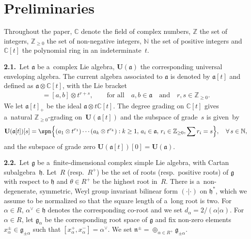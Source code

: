 \section{Preliminaries}\label{section2}

Throughout the paper, $\mathbb{C}$ denote the f\/ield of complex numbers, $\mathbb{Z}$ the set of integers,
$\mathbb{Z}_{\geq 0}$ the set of non-negative integers, $\mathbb{N}$ the set of positive integers and $\mathbb{C}[t]$
the polynomial ring in an indeterminate~$t$.

{\bf 2.1.}~Let $\mathfrak{a}$ be a~complex Lie algebra, $\mathbf{U}(\mathfrak{a})$ the corresponding universal
enveloping algebra.
The current algebra associated to $\mathfrak{a}$ is denoted by $\mathfrak{a}[t]$ and def\/ined as $\mathfrak{a} \otimes
\mathbb{C}[t]$, with the Lie bracket
\begin{gather*}
[a \otimes t^r, b \otimes t^s]=[a, b]\otimes t^{r+s},
\qquad
\text{for all}
\quad
a, b \in \mathfrak{a}
\quad
\text{and}
\quad
r, s \in \mathbb{Z}_{\geq 0}.
\end{gather*}
We let $\mathfrak{a}[t]_{+}$ be the ideal $\mathfrak{a}\otimes t\mathbb{C}[t]$. The degree grading on $\mathbb{C}[t]$
gives a~natural $\mathbb{Z}_{\geq 0}$-grading on~$\mathbf{U}(\mathfrak{a}[t])$ and the subspace of grade~$s$ is given~by
\begin{gather*}
\mathbf{U}(\mathfrak{a}[t])[s]= \spn \Big\{(a_1\otimes t^{r_1})\cdots (a_k\otimes t^{r_k}):k\geq 1,\,
a_i\in\mathfrak{a},\, r_i\in \mathbb{Z}_{\geq 0}, \sum r_i=s\Big\},
\quad
\forall\, s\in \mathbb{N},
\end{gather*}
and the subspace of grade zero $\mathbf{U}(\mathfrak{a}[t])[0]=\mathbf{U}(\mathfrak{a})$.

{\bf 2.2.}~Let $\mathfrak{g}$ be a~f\/inite-dimensional complex simple Lie algebra, with Cartan subalgebra~$\mathfrak{h}$.
Let~$R$ (resp.~$R^+$) be the set of roots (resp.\
positive roots) of $\mathfrak{g}$ with respect to $\mathfrak{h}$ and $\theta \in R^+$ be the highest root in~$R$.
There is a~non-degenerate, symmetric, Weyl group invariant bilinear form $(\cdot|\cdot)$ on $\mathfrak{h}^*$, which we assume to
be normalized so that the square length of a~long root is two.
For $\alpha\in R$, $\alpha^{\vee}\in\mathfrak{h}$ denotes the corresponding co-root and we set
$d_{\alpha}=2/(\alpha|\alpha)$. For $\alpha\in R$, let $\mathfrak{g}_{\alpha}$ be the corresponding root space of
$\mathfrak{g}$ and f\/ix non-zero elements $x^{\pm}_{\alpha}\in \mathfrak{g}_{\pm\alpha}$ such that $[x^{+}_{\alpha},x^{-}_{\alpha}]=\alpha^{\vee}$.
We set $\mathfrak{n}^{\pm}=\oplus_{\alpha\in R^{+}}  \mathfrak{g}_{\pm\alpha}$.

